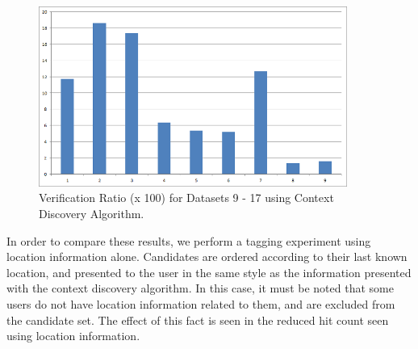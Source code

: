 \begin{figure}[t]
\centering
\includegraphics[width=0.9\textwidth]{media/chapter5/cx-verification-ratio.png}
\caption{Verification Ratio (x 100) for Datasets 9 - 17 using Context Discovery Algorithm.}
\label{fig:exp-cx-verification-ratio}
\end{figure}

In order to compare these results, we perform a tagging experiment using location information alone. Candidates are ordered according to their last known location, and presented to the user in the same style as the information presented with the context discovery algorithm. In this case, it must be noted that some users do not have location information related to them, and are excluded from the candidate set. The effect of this fact is seen in the reduced hit count seen using location information.

